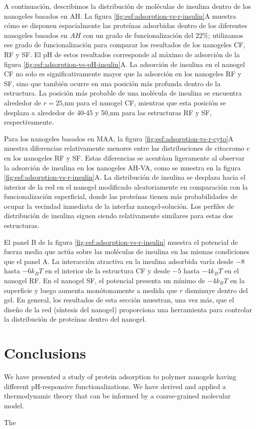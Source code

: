 A continuaci\'on, describimos la distribuci\'on de mol\'eculas de insulina dentro de los nanogeles basados en AH.
La figura \ref{fig:esf:adsorption-vs-r-insulin}A muestra c\'omo se disponen espacialmente las prote\'inas adsorbidas dentro de los diferentes nanogeles basados en $AH$ con un grado de funcionalizaci\'on del $22\%$;
utilizamos ese grado de funcionalizaci\'on para comparar los resultados de los nanogeles CF, RF y SF.
El pH de estos resultados corresponde al m\'aximo de adsorci\'on de la figura \ref{fig:esf:adsorption-vs-pH-insulin}A.
La adsorci\'on de insulina en el nanogel CF no solo es significativamente mayor que la adsorci\'on en los nanogeles RF y SF, sino que tambi\'en ocurre en una posici\'on m\'as profunda dentro de la estructura.
La posici\'on m\'as probable de una mol\'ecula de insulina se encuentra alrededor de $r=25$,nm para el nanogel CF,
mientras que esta posici\'on se desplaza a alrededor de 40-45 y 50,nm para las estructuras RF y SF, respectivamente.

Para los nanogeles basados en MAA, la figura \ref{fig:esf:adsorption-vs-r-cyto}A muestra diferencias relativamente menores entre las distribuciones de citocromo c en los nanogeles RF y SF.
Estas diferencias se acent\'uan ligeramente al observar la adsorci\'on de insulina en los nanogeles AH-VA, como se muestra en la figura \ref{fig:esf:adsorption-vs-r-insulin}A.
La distribuci\'on de insulina se desplaza hacia el interior de la red en el nanogel modificado aleatoriamente en comparaci\'on con la funcionalizaci\'on superficial, donde las prote\'inas tienen m\'as probabilidades de ocupar la vecindad inmediata de la interfaz nanogel-soluci\'on.
Los perfiles de distribuci\'on de insulina siguen siendo relativamente similares para estas dos estructuras.

El panel B de la figura \ref{fig:esf:adsorption-vs-r-insulin} muestra el potencial de fuerza media que act\'ua sobre las mol\'eculas de insulina en las mismas condiciones que el panel A.
La interacci\'on atractiva en la insulina adsorbida var\'ia desde $-8$ hasta $-6 k_B T$ en el interior de la estructura CF y desde $-5$ hasta $-4 k_B T$ en el nanogel RF.
En el nanogel SF, el potencial presenta un m\'inimo de $-4 k_B T$ en la superficie y luego aumenta mon\'otonamente a medida que $r$ disminuye dentro del gel.
En general, los resultados de esta secci\'on muestran, una vez m\'as, que el dise\~no de la red (s\'intesis del nanogel) proporciona una herramienta para controlar la distribuci\'on de prote\'inas dentro del nanogel.






\section{Conclusions}


We have presented a study of protein adsorption to polymer nanogels having  different pH-responsive functionalizations.
We have derived and applied a thermodynamic theory that can be informed by a coarse-grained molecular model.

The 



